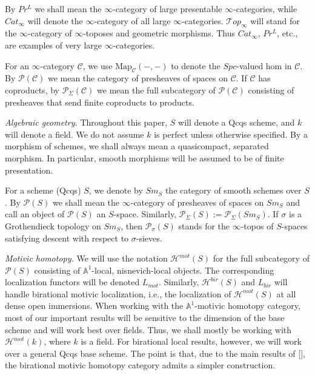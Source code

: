  By $Pr^L$ we shall mean the $\infty$-category of large presentable $\infty$-categories, while $Cat_{\infty}$ will denote the $\infty$-category of all large $\infty$-categories. $\mathcal{T}op_\infty$ will stand for the $\infty$-category of $\infty$-toposes and geometric morphisms. Thus $Cat_\infty$, $Pr^L$, etc., are examples of very large $\infty$-categories.
 


For an $\infty$-category $\mathcal{C}$, we use $\mathrm{Map}_\mathcal{C}(-,-)$ to denote the $Spc$-valued hom in $\mathcal{C}$. By $\mathcal{P}(\mathcal{C})$ we mean the category of presheaves of spaces on $\mathcal{C}$. If $\mathcal{C}$ has coproducts, by $\mathcal{P}_\Sigma(\mathcal{C})$ we mean the full subcategory of $\mathcal{P}(\mathcal{C})$ consisting of presheaves that send finite coproducts to products.  

\textit{Algebraic geometry.}
Throughout this paper, $S$ will denote a Qcqs scheme, and $k$ will denote a field. We do not assume $k$ is perfect unless otherwise specified. By a morphism of schemes, we shall always mean a quasicompact, separated morphism. In particular, smooth morphisms will be assumed to be of finite presentation.


For a scheme (Qcqs) $S$, we denote by $Sm_S$ the category of smooth schemes over $S$. By $\mathcal{P}(S)$ we shall mean the $\infty$-category of presheaves of spaces on $Sm_S$ and call an object of $\mathcal{P}(S)$ an $S$-space. Similarly, $\mathcal{P}_\Sigma(S):=\mathcal{P}_\Sigma(Sm_S)$. If $\sigma$ is a Grothendieck topology on $Sm_S$, then $\mathcal{P}_\sigma(S)$ stands for the $\infty$-topos of $S$-spaces satisfying descent with respect to $\sigma$-sieves.

 \textit{Motivic homotopy.}
We will use the notation $\mathcal{H}^{mot}(S)$ for the full subcategory of $\mathcal{P}(S)$ consisting of $\mathbb{A}^1$-local, nisnevich-local objects. The corresponding localization functors will be denoted $L_{mot}$. Similarly, $\mathcal{H}^{bir}(S)$ and $L_{bir}$ will handle birational motivic localization, i.e., the localization of $\mathcal{H}^{mot}(S)$ at all dense open immersions. When working with the $\mathbb{A}^1$-motivic homotopy category, most of our important results will be sensitive to the dimension of the base scheme and will work best over fields. Thus, we shall mostly be working with $\mathcal{H}^{mot}(k)$, where $k$ is a field. For birational local results, however, we will work over a general Qcqs base scheme. The point is that, due to the main results of [\cite{0bat}], the birational motivic homotopy category admits a simpler construction.

